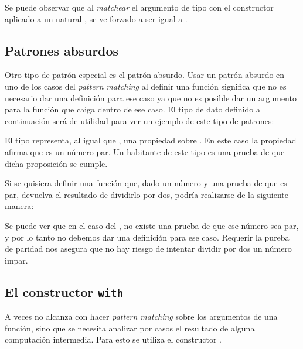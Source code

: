 
Se puede observar que al \textit{matchear} el argumento de tipo   con el constructor  aplicado a un natural ,  se ve forzado a ser igual a  \AgdaFunction{*} .


\subsection{Patrones absurdos}\label{tipos:absurdos}

Otro tipo de patrón especial es el patrón absurdo. Usar un patrón absurdo en uno de los casos del \textit{pattern matching} al definir una función significa que no es necesario dar una definición para ese caso ya que no es posible dar un argumento para la función que caiga dentro de ese caso. El tipo de dato definido a continuación será de utilidad para ver un ejemplo de este tipo de patrones:


El tipo   representa, al igual que  , una propiedad sobre . En este caso la propiedad afirma que  es un número par. Un habitante de este tipo es una prueba de que dicha proposición se cumple. 

Si se quisiera definir una función que, dado un número y una prueba de que es par, devuelva el resultado de dividirlo por dos, podría realizarse de la siguiente manera:


Se puede ver que en el caso del , no existe una prueba de que ese número sea par, y por lo tanto no debemos dar una definición para ese caso. Requerir la pureba de paridad nos asegura que no hay riesgo de intentar dividir por dos un número impar. 

\subsection{El constructor \texttt{with}}\label{tipos:with}

A veces no alcanza con hacer \textit{pattern matching} sobre los argumentos de una función, sino que se necesita analizar por casos el resultado de alguna computación intermedia. Para esto se utiliza el constructor . 

